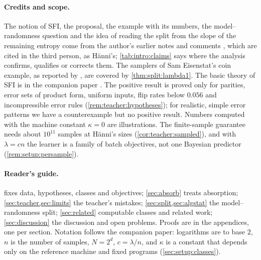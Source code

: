 \paragraph{Credits and scope.} The notion of SFI, the proposal, the example with its numbers, the model--randomness question and the idea of reading the split from the slope of the remaining entropy come from the author's earlier notes and comments \citep{hanni2026notes,hanni2026lesswrong,hanni2026request}, which are cited in the third person, as H\"anni's; \cref{tab:intro:claims} says where the analysis confirms, qualifies or corrects them. The samplers of Sam Eisenstat's coin example, as reported by \citet{hanni2026request}, are covered by \cref{thm:split:lambda1}. The basic theory of SFI is in the companion paper \citep{claudeSFI2026fundamentals}. The positive result is proved only for parities, error sets of product form, uniform inputs, flip rates below $0.056$ and incompressible error rules (\cref{rem:teacher:hypotheses}); for realistic, simple error patterns we have a counterexample but no positive result. Numbers computed with the machine constant $\kappa=0$ are illustrations. The finite-sample guarantee needs about $10^{11}$ samples at H\"anni's sizes (\cref{cor:teacher:sampled}), and with $\lambda=cn$ the learner is a family of batch objectives, not one Bayesian predictor (\cref{rem:setup:persample}).

\paragraph{Reader's guide.}  fixes data, hypotheses, classes and objectives; \cref{sec:absorb} treats absorption; \cref{sec:teacher,sec:limits} the teacher's mistakes; \cref{sec:split,sec:algstat} the model--randomness split; \cref{sec:related} computable classes and related work; \cref{sec:discussion} the discussion and open problems. Proofs are in the appendices, one per section. Notation follows the companion paper: logarithms are to base $2$, $n$ is the number of samples, $N=2^d$, $c=\lambda/n$, and $\kappa$ is a constant that depends only on the reference machine and fixed programs (\cref{sec:setup:classes}).
